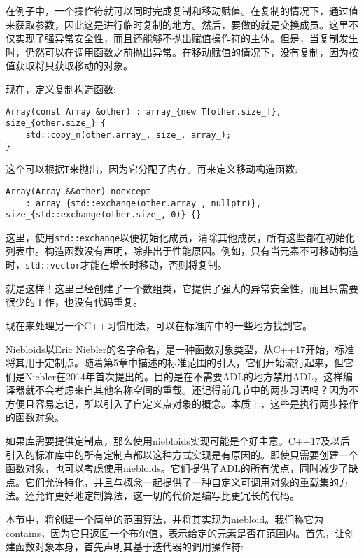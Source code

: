 在例子中，一个操作符就可以同时完成复制和移动赋值。在复制的情况下，通过值来获取参数，因此这是进行临时复制的地方。然后，要做的就是交换成员。这里不仅实现了强异常安全性，而且还能够不抛出赋值操作符的主体。但是，当复制发生时，仍然可以在调用函数之前抛出异常。在移动赋值的情况下，没有复制，因为按值获取将只获取移动的对象。

现在，定义复制构造函数:

\begin{lstlisting}[style=styleCXX]
Array(const Array &other) : array_{new T[other.size_]},
size_{other.size_} {
	std::copy_n(other.array_, size_, array_);
}
\end{lstlisting}

这个可以根据\texttt{T}来抛出，因为它分配了内存。再来定义移动构造函数:

\begin{lstlisting}[style=styleCXX]
Array(Array &&other) noexcept
	: array_{std::exchange(other.array_, nullptr)},
size_{std::exchange(other.size_, 0)} {}
\end{lstlisting}

这里，使用\texttt{std::exchange}以便初始化成员，清除其他成员，所有这些都在初始化列表中。构造函数没有声明，除非出于性能原因。例如，只有当元素不可移动构造时，\texttt{std::vector}才能在增长时移动，否则将复制。

就是这样！这里已经创建了一个数组类，它提供了强大的异常安全性，而且只需要很少的工作，也没有代码重复。

现在来处理另一个C++习惯用法，可以在标准库中的一些地方找到它。


Niebloids以Eric Niebler的名字命名，是一种函数对象类型，从C++17开始，标准将其用于定制点。随着第5章中描述的标准范围的引入，它们开始流行起来，但它们是Niebler在2014年首次提出的。目的是在不需要ADL的地方禁用ADL，这样编译器就不会考虑来自其他名称空间的重载。还记得前几节中的两步习语吗？因为不方便且容易忘记，所以引入了自定义点对象的概念。本质上，这些是执行两步操作的函数对象。

如果库需要提供定制点，那么使用niebloids实现可能是个好主意。C++17及以后引入的标准库中的所有定制点都以这种方式实现是有原因的。即使只需要创建一个函数对象，也可以考虑使用niebloids。它们提供了ADL的所有优点，同时减少了缺点。它们允许特化，并且与概念一起提供了一种自定义可调用对象的重载集的方法。还允许更好地定制算法，这一切的代价是编写比更冗长的代码。

本节中，将创建一个简单的范围算法，并将其实现为niebloid。我们称它为contains，因为它只返回一个布尔值，表示给定的元素是否在范围内。首先，让创建函数对象本身，首先声明其基于迭代器的调用操作符:

